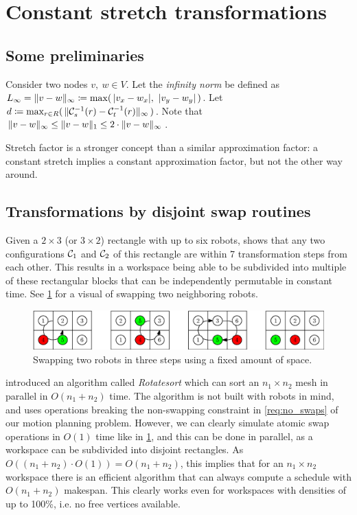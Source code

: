 \section{Constant stretch transformations}\label{chapter:constant_stretch}

\subsection{Some preliminaries}

Consider two nodes \(v,\ w \in V\). 
Let the \emph{infinity norm} be defined as \(L_\infty = \lVert v - w\rVert_\infty \coloneqq \max(\, \lvert v_x - w_x\rvert,\ \lvert v_y - w_y\rvert \,)\). 
Let \(d \coloneqq \max_{r \in R}(\, \lVert\mathcal{C}_{s}^{-1}(r) - \mathcal{C}_{t}^{-1}(r)\rVert_\infty \,)\). 
Note that \(\lVert v - w\rVert_\infty \leq \lVert v - w\rVert_1 \leq 2\cdot \lVert v - w\rVert_\infty\).


\begin{remark}
	Stretch factor is a stronger concept than a similar approximation factor: a constant stretch implies a constant approximation factor, but not the other way around.
\end{remark}

\subsection{Transformations by disjoint swap routines}

Given a \(2 \times 3\) (or \(3 \times 2\)) rectangle with up to six robots, \cite{siamcomp/DemaineFKMS19} shows that any two configurations \(\mathcal{C}_{1}\) and \(\mathcal{C}_{2}\) of this rectangle are within 7 transformation steps from each other. 
This results in a workspace being able to be subdivided into multiple of these rectangular blocks that can be independently permutable in constant time. 
See \cref{fig:swap3} for a visual of swapping two neighboring robots.

\begin{figure}[h]
	\centering
	\includegraphics[width=0.8\linewidth]{ipe/swap_ex.eps}
	\caption{
		Swapping two robots in three steps using a fixed amount of space.
	}\label{fig:swap3}
\end{figure}

\cite{algorithmica/MarbergG88} introduced an algorithm called \emph{Rotatesort} which can sort an \(n_1 \times n_2\) mesh in parallel in \(O(n_1 + n_2)\) time. 
The algorithm is not built with robots in mind, and uses operations breaking the non-swapping constraint in \cref{req:no_swaps} of our motion planning problem. 
However, we can clearly simulate atomic swap operations in \(O(1)\) time like in \cref{fig:swap3}, and this can be done in parallel, as a workspace can be subdivided into disjoint rectangles. 
As \(O((n_1 + n_2) \cdot O(1)) = O(n_1 + n_2)\), this implies that for an \(n_1 \times n_2\) workspace there is an efficient algorithm that can always compute a schedule with \(O(n_1 + n_2)\) makespan. 
This clearly works even for workspaces with densities of up to 100\%, i.e. no free vertices available.  

